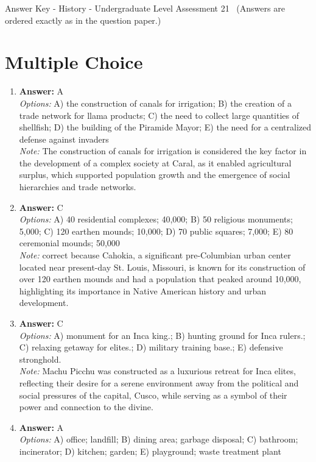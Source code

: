 \documentclass[12pt]{article}
\begin{document}
\begin{center}
Answer Key - History - Undergraduate Level Assessment 21 \
\small (Answers are ordered exactly as in the question paper.)
\end{center}

\section*{Multiple Choice}
\begin{enumerate}[label=\arabic*.]
\item \textbf{Answer:} A
\\ \textit{Options:} A) the construction of canals for irrigation; B) the creation of a trade network for llama products; C) the need to collect large quantities of shellfish; D) the building of the Piramide Mayor; E) the need for a centralized defense against invaders
\\ \textit{Note:} The construction of canals for irrigation is considered the key factor in the development of a complex society at Caral, as it enabled agricultural surplus, which supported population growth and the emergence of social hierarchies and trade networks.
\item \textbf{Answer:} C
\\ \textit{Options:} A) 40 residential complexes; 40,000; B) 50 religious monuments; 5,000; C) 120 earthen mounds; 10,000; D) 70 public squares; 7,000; E) 80 ceremonial mounds; 50,000
\\ \textit{Note:} correct because Cahokia, a significant pre-Columbian urban center located near present-day St. Louis, Missouri, is known for its construction of over 120 earthen mounds and had a population that peaked around 10,000, highlighting its importance in Native American history and urban development.
\item \textbf{Answer:} C
\\ \textit{Options:} A) monument for an Inca king.; B) hunting ground for Inca rulers.; C) relaxing getaway for elites.; D) military training base.; E) defensive stronghold.
\\ \textit{Note:} Machu Picchu was constructed as a luxurious retreat for Inca elites, reflecting their desire for a serene environment away from the political and social pressures of the capital, Cusco, while serving as a symbol of their power and connection to the divine.
\item \textbf{Answer:} A
\\ \textit{Options:} A) office; landfill; B) dining area; garbage disposal; C) bathroom; incinerator; D) kitchen; garden; E) playground; waste treatment plant

\end{enumerate}
\end{document}
